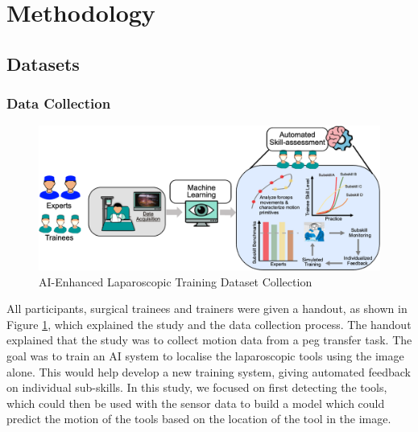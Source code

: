 \section{Methodology}

\subsection{Datasets}


\subsubsection{Data Collection}




\begin{figure}
    \centering
    \includegraphics[width=1\linewidth]{dataset_collection.png}
    \caption{AI-Enhanced Laparoscopic Training Dataset Collection}
    \label{fig:dataset-collection}
\end{figure}

All participants, surgical trainees and trainers were given a handout, as shown in Figure \ref{fig:dataset-collection}, which explained the study and the data collection process. The handout explained that the study was to collect motion data from a peg transfer task. The goal was to train an AI system to localise the laparoscopic tools using the image alone. This would help develop a new training system, giving automated feedback on individual sub-skills. In this study, we focused on first detecting the tools, which could then be used with the sensor data to build a model which could predict the motion of the tools based on the location of the tool in the image.

